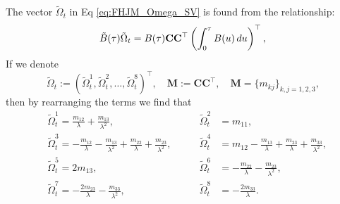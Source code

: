 \documentclass[pdftex,11pt,a4paper] {article}
\begin{document}
The vector $\tilde\Omega_t$ in Eq \eqref{eq:FHJM_Omega_SV} is found from the relationship:
\begin{equation*}
\tilde B(\tau)\tilde\Omega_t=B(\tau)\mathbf{C}\mathbf{C}^\top \left(\int_0^\tau B(u)\,du\right)^\top,\\
\end{equation*}
If we denote
\begin{equation*}
\tilde\Omega_t:=\left(\tilde\Omega_t^1,\tilde\Omega_t^2,\ldots, \tilde\Omega_t^8\right)^\top,\quad 
\mathbf{M}:=\mathbf{C}\mathbf{C}^\top, \quad \mathbf{M}=\{m_{kj}\}_{k,j=1,2,3}, 
\end{equation*}
then by rearranging the terms we find that 
\begin{equation}\label{eq:NS_Omega}
\begin{alignedat}{2}
&\tilde\Omega_t^1=\frac{m_{12}}{\lambda}+\frac{m_{13}}{\lambda^2}, \qquad
&\tilde\Omega_t^2&=m_{11}, \\
&\tilde\Omega_t^3=-\frac{m_{12}}{\lambda}-\frac{m_{13}}{\lambda^2}+\frac{m_{22}}{\lambda}+\frac{m_{23}}{\lambda^2}, \qquad 
&\tilde\Omega_t^4&=m_{12}-\frac{m_{13}}{\lambda}+\frac{m_{23}}{\lambda}+\frac{m_{33}}{\lambda^2},\\
&\tilde\Omega_t^5=2m_{13},\qquad 
&\tilde\Omega_t^6&=-\frac{m_{22}}{\lambda}-\frac{m_{23}}{\lambda^2},\\
&\tilde\Omega_t^7=-\frac{2m_{23}}{\lambda}-\frac{m_{33}}{\lambda^2},\qquad
&\tilde\Omega_t^8&=-\frac{2m_{33}}{\lambda}.
\end{alignedat}
\end{equation}
\end{document}

